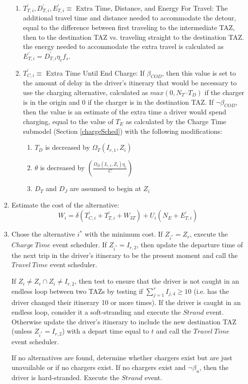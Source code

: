\documentclass[journal]{IEEEtran}
\begin{document}
\begin{enumerate}[label=(\alph*)]
\begin{enumerate}[label=(\roman*)]
  \item $T^{\prime}_{T,i}, D^{\prime}_{T,i}, E^{\prime}_{T,i} \equiv$ Extra Time, Distance, and Energy For Travel: The additional travel time and distance needed to accommodate the detour, equal to the difference between first traveling to the intermediate TAZ, then to the destination TAZ vs. traveling straight to the destination TAZ. the energy needed to accommodate the extra travel is calculated as $E^{\prime}_{T,i} = D^{\prime}_{T,i} \eta_e f_s$.
  \item $T^{\prime}_{C,i} \equiv$ Extra Time Until End Charge: If $\beta_{COD} $, then this value is set to the amount of delay in the driver's itinerary that would be necessary to use the charging alternative, calculated as $max(0, N_T – T_D)$ if the charger is in the origin and $0$ if the charger is in the destination TAZ. If $\neg \beta_{COD}$, then the value is an estimate of the extra time a driver would spend charging, equal to the value of $T_E$ as calculated by the Charge Time submodel (Section \ref{chargeSched}) with the following modifications:
    \begin{enumerate}[label=(\roman*)]
      \item $T_D$ is decreased by $\Omega_T(I_{r,1},Z_i)$
      \item $\theta$ is decreased by $\left(\frac{\Omega_D(I_{r,1},Z_i) \eta_e}{C}\right)$ 
      \item $D_T$ and $D_J$ are assumed to begin at $Z_i$
    \end{enumerate}
  \end{enumerate}
\item Estimate the cost of the alternative:
  \begin{equation}
    W_i = \delta (T^{\prime}_{C,i} + T^{\prime}_{T,i} + W_{3T}) + U_i(N_E +  E^{\prime}_{T,i})
  \end{equation}
\item Chose the alternative $i^*$ with the minimum cost.  If $Z_{i^*} = Z_r$, execute the $Charge ~Time$ event scheduler. If $Z_{i^*} = I_{r,2}$, then update the departure time of the next trip in the driver's itinerary to be the present moment and call the $Travel ~Time$ event scheduler.

  If $Z_i \ne Z_r \cap Z_i \ne I_{r,2}$, then test to ensure that the driver is not caught in an endless loop between two TAZs by testing if $\sum_{j=1}^r I_{j,4} \ge 10$ (i.e. has the driver changed their itinerary 10 or more times).  If the driver is caught in an endless loop, consider it a soft-stranding and execute the $Strand$ event.  Otherwise update the driver's itinerary to include the new destination TAZ (unless $Z_{i^*} = I_{r,2}$) with a depart time equal to $t$ and call the $Travel ~Time$ event scheduler.  

If no alternatives are found, determine whether chargers exist but are just unavailable or if no chargers exist.  If no chargers exist and $\neg \beta_u $, then the driver is hard-stranded.  Execute the $Strand$ event. 
\end{enumerate}
\end{document}
